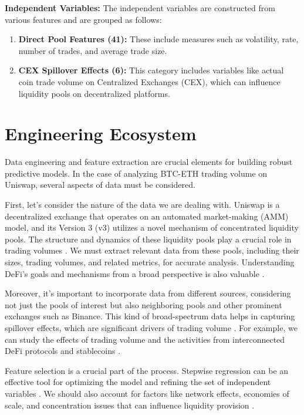 \documentclass{article}
\begin{document}
\textbf{Independent Variables:} The independent variables are constructed from various features and are grouped as follows:

\begin{enumerate}[label=\arabic*. ,itemsep=0pt, topsep=0pt]
\item \textbf{Direct Pool Features (41):} These include measures such as volatility, rate, number of trades, and average trade size.
\item \textbf{CEX Spillover Effects (6):} This category includes variables like actual coin trade volume on Centralized Exchanges (CEX), which can influence liquidity pools on decentralized platforms.
\end{enumerate}

\section*{\textbf{Engineering Ecosystem}}

Data engineering and feature extraction are crucial elements for building robust predictive models. In the case of analyzing BTC-ETH trading volume on Uniswap, several aspects of data must be considered.

First, let's consider the nature of the data we are dealing with. Uniswap is a decentralized exchange that operates on an automated market-making (AMM) model, and its Version 3 (v3) utilizes a novel mechanism of concentrated liquidity pools. The structure and dynamics of these liquidity pools play a crucial role in trading volumes \cite{Miori2023}. We must extract relevant data from these pools, including their sizes, trading volumes, and related metrics, for accurate analysis. Understanding DeFi's goals and mechanisms from a broad perspective is also valuable \cite{Makarov2022}.

Moreover, it's important to incorporate data from different sources, considering not just the pools of interest but also neighboring pools and other prominent exchanges such as Binance. This kind of broad-spectrum data helps in capturing spillover effects, which are significant drivers of trading volume \cite{Miori2023}. For example, we can study the effects of trading volume and the activities from interconnected DeFi protocols and stablecoins \cite{Miori2022}.

Feature selection is a crucial part of the process. Stepwise regression can be an effective tool for optimizing the model and refining the set of independent variables \cite{Miori2023}. We should also account for factors like network effects, economies of scale, and concentration issues that can influence liquidity provision \cite{Makarov2022, Miori2022}.
\end{document}
